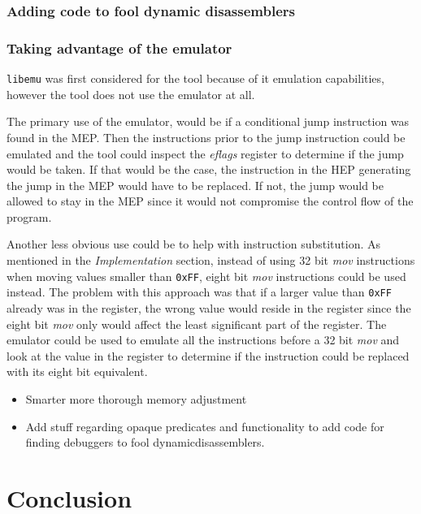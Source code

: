\documentclass[11pt,twoside]{eitExjobb}
\begin{document}
\subsection{Adding code to fool dynamic disassemblers}

\subsection{Taking advantage of the emulator}
\texttt{libemu} was first considered for the tool because of it emulation capabilities, however the tool does not use the emulator at all. 

The primary use of the emulator, would be if a conditional jump instruction was found in the MEP. Then the instructions prior to the jump instruction could be emulated and the tool could inspect the \emph{eflags} register to determine if the jump would be taken. If that would be the case, the instruction in the HEP generating the jump in the MEP would have to be replaced. If not, the jump would be allowed to stay in the MEP since it would not compromise the control flow of the program.

Another less obvious use could be to help with instruction substitution. As mentioned in the \emph{Implementation} section, instead of using 32 bit \emph{mov} instructions when moving values smaller than \texttt{0xFF}, eight bit \emph{mov} instructions could be used instead. The problem with this approach was that if a larger value than \texttt{0xFF} already was in the register, the wrong value would reside in the register since the eight bit \emph{mov} only would affect the least significant part of the register. The emulator could be used to emulate all the instructions before a 32 bit \emph{mov} and look at the value in the register to determine if the instruction could be replaced with its eight bit equivalent.

\begin{itemize}
\item{Smarter more thorough memory adjustment}
\item{Add stuff regarding opaque predicates and functionality to add code for finding debuggers to fool dynamic}disassemblers.
\end{itemize}

\chapter{Conclusion}
{}


\end{document}
